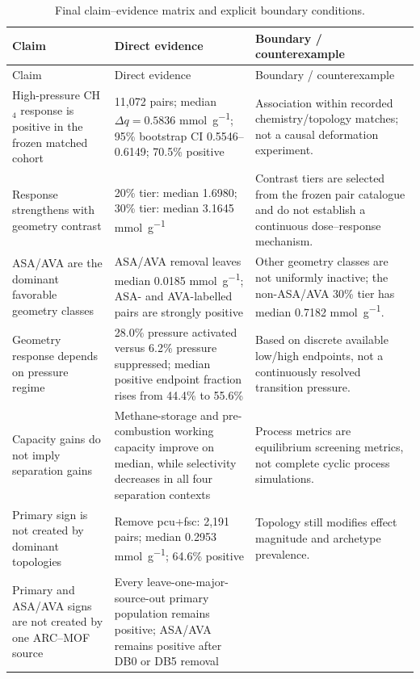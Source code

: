 \documentclass[11pt,a4paper]{article}
\begin{document}
\begingroup
\small
\setlength{\tabcolsep}{4pt}
\begin{longtable}{p{}p{}p{}}
\caption{Final claim--evidence matrix and explicit boundary conditions.}
\label{tab:S22}\\
\toprule
Claim & Direct evidence & Boundary / counterexample \\
\midrule
\endfirsthead
\toprule
Claim & Direct evidence & Boundary / counterexample \\
\midrule
\endhead
High-pressure CH$_4$ response is positive in the frozen matched cohort &
11,072 pairs; median $\Delta q=0.5836$ \si{\milli\mole\per\gram};
95\% bootstrap CI 0.5546--0.6149; 70.5\% positive &
Association within recorded chemistry/topology matches; not a causal deformation
experiment. \\
\addlinespace
Response strengthens with geometry contrast &
20\% tier: median 1.6980; 30\% tier: median 3.1645
\si{\milli\mole\per\gram} &
Contrast tiers are selected from the frozen pair catalogue and do not establish a
continuous dose--response mechanism. \\
\addlinespace
ASA/AVA are the dominant favorable geometry classes &
ASA/AVA removal leaves median 0.0185
\si{\milli\mole\per\gram}; ASA- and AVA-labelled pairs are strongly positive &
Other geometry classes are not uniformly inactive; the non-ASA/AVA 30\% tier has
median 0.7182 \si{\milli\mole\per\gram}. \\
\addlinespace
Geometry response depends on pressure regime &
28.0\% pressure activated versus 6.2\% pressure suppressed; median positive
endpoint fraction rises from 44.4\% to 55.6\% &
Based on discrete available low/high endpoints, not a continuously resolved
transition pressure. \\
\addlinespace
Capacity gains do not imply separation gains &
Methane-storage and pre-combustion working capacity improve on median, while
selectivity decreases in all four separation contexts &
Process metrics are equilibrium screening metrics, not complete cyclic process
simulations. \\
\addlinespace
Primary sign is not created by dominant topologies &
Remove pcu+fsc: 2,191 pairs; median 0.2953
\si{\milli\mole\per\gram}; 64.6\% positive &
Topology still modifies effect magnitude and archetype prevalence. \\
\addlinespace
Primary and ASA/AVA signs are not created by one ARC--MOF source &
Every leave-one-major-source-out primary population remains positive; ASA/AVA
remains positive after DB0 or DB5 removal &

\end{longtable}
\end{document}
